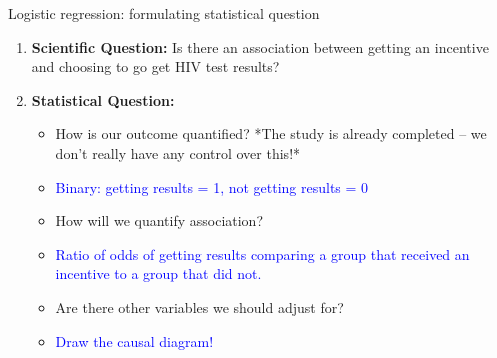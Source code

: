 \documentclass[10pt,t]{beamer}
\begin{document}
\begin{frame}{Logistic regression: formulating statistical question}


	
	\medskip
	
	\begin{enumerate}
		\item \textbf{Scientific Question:}  Is there an association between getting an incentive and choosing to go get HIV test results?
		
		\medskip
		
		\item \textbf{Statistical Question:}   
		\begin{itemize}
			\item How is our outcome quantified? *The study is already completed -- we don't really have any control over this!* 
			
			\medskip
			
			\item[] \textcolor{blue}{Binary: getting results = 1, not getting results = 0} 
			
			\medskip
			
			\item How will we quantify association?  
			
			\medskip
			
			\item[] \textcolor{blue}{Ratio of odds of getting results comparing a group that received an incentive to a group that did not.} 
			
			\medskip
			
			\item Are there other variables we should adjust for? 
			
			\medskip
			
			\item[] \textcolor{blue}{Draw the causal diagram!} 
		\end{itemize}
	\end{enumerate}
\end{frame}
\end{document}
